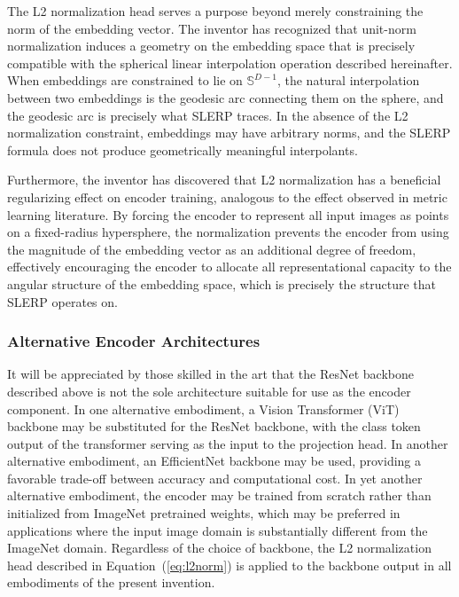 \documentclass[12pt,letterpaper]{article}
\begin{document}
The L2 normalization head serves a purpose beyond merely constraining the norm
of the embedding vector. The inventor has recognized that unit-norm
normalization induces a geometry on the embedding space that is precisely
compatible with the spherical linear interpolation operation described
hereinafter. When embeddings are constrained to lie on $\mathbb{S}^{D-1}$, the
natural interpolation between two embeddings is the geodesic arc connecting
them on the sphere, and the geodesic arc is precisely what SLERP traces. In the
absence of the L2 normalization constraint, embeddings may have arbitrary norms,
and the SLERP formula does not produce geometrically meaningful interpolants.

Furthermore, the inventor has discovered that L2 normalization has a beneficial
regularizing effect on encoder training, analogous to the effect observed in
metric learning literature. By forcing the encoder to represent all input images
as points on a fixed-radius hypersphere, the normalization prevents the encoder
from using the magnitude of the embedding vector as an additional degree of
freedom, effectively encouraging the encoder to allocate all representational
capacity to the angular structure of the embedding space, which is precisely
the structure that SLERP operates on.

\subsubsection{Alternative Encoder Architectures}

It will be appreciated by those skilled in the art that the ResNet backbone
described above is not the sole architecture suitable for use as the encoder
component. In one alternative embodiment, a Vision Transformer (ViT) backbone
may be substituted for the ResNet backbone, with the class token output of the
transformer serving as the input to the projection head. In another alternative
embodiment, an EfficientNet backbone may be used, providing a favorable
trade-off between accuracy and computational cost. In yet another alternative
embodiment, the encoder may be trained from scratch rather than initialized
from ImageNet pretrained weights, which may be preferred in applications where
the input image domain is substantially different from the ImageNet domain.
Regardless of the choice of backbone, the L2 normalization head described in
Equation~(\ref{eq:l2norm}) is applied to the backbone output in all embodiments
of the present invention.
\end{document}
